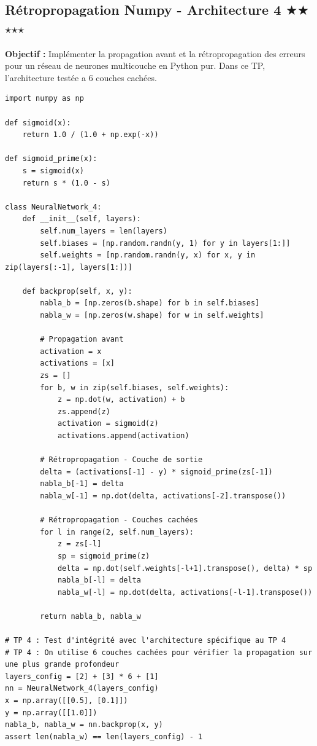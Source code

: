 \documentclass[11pt,a4paper]{article}
\begin{document}
\vspace{1cm}

\subsection*{Rétropropagation Numpy - Architecture 4 $\bigstar$$\bigstar$$\star$$\star$$\star$}

\textbf{Objectif :}
Implémenter la propagation avant et la rétropropagation des erreurs pour un réseau de neurones multicouche en Python pur.
Dans ce TP, l'architecture testée a 6 couches cachées.

\begin{lstlisting}
import numpy as np

def sigmoid(x):
    return 1.0 / (1.0 + np.exp(-x))

def sigmoid_prime(x):
    s = sigmoid(x)
    return s * (1.0 - s)

class NeuralNetwork_4:
    def __init__(self, layers):
        self.num_layers = len(layers)
        self.biases = [np.random.randn(y, 1) for y in layers[1:]]
        self.weights = [np.random.randn(y, x) for x, y in zip(layers[:-1], layers[1:])]

    def backprop(self, x, y):
        nabla_b = [np.zeros(b.shape) for b in self.biases]
        nabla_w = [np.zeros(w.shape) for w in self.weights]

        # Propagation avant
        activation = x
        activations = [x]
        zs = []
        for b, w in zip(self.biases, self.weights):
            z = np.dot(w, activation) + b
            zs.append(z)
            activation = sigmoid(z)
            activations.append(activation)

        # Rétropropagation - Couche de sortie
        delta = (activations[-1] - y) * sigmoid_prime(zs[-1])
        nabla_b[-1] = delta
        nabla_w[-1] = np.dot(delta, activations[-2].transpose())

        # Rétropropagation - Couches cachées
        for l in range(2, self.num_layers):
            z = zs[-l]
            sp = sigmoid_prime(z)
            delta = np.dot(self.weights[-l+1].transpose(), delta) * sp
            nabla_b[-l] = delta
            nabla_w[-l] = np.dot(delta, activations[-l-1].transpose())

        return nabla_b, nabla_w

# TP 4 : Test d'intégrité avec l'architecture spécifique au TP 4
# TP 4 : On utilise 6 couches cachées pour vérifier la propagation sur une plus grande profondeur
layers_config = [2] + [3] * 6 + [1]
nn = NeuralNetwork_4(layers_config)
x = np.array([[0.5], [0.1]])
y = np.array([[1.0]])
nabla_b, nabla_w = nn.backprop(x, y)
assert len(nabla_w) == len(layers_config) - 1
\end{lstlisting}
\end{document}
